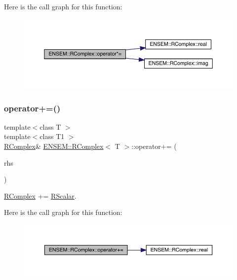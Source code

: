 Here is the call graph for this function\+:
\nopagebreak
\begin{figure}[H]
\begin{center}
\leavevmode
\includegraphics[width=350pt]{d9/d0e/classENSEM_1_1RComplex_a9b5f1c26c1d2cca0a3a0a6d38b5e49bd_cgraph}
\end{center}
\end{figure}
\mbox{\label{classENSEM_1_1RComplex_a0a7beaab81b8f5e2129a4c7b1074f85c}} 
\subsubsection{\texorpdfstring{operator+=()}{operator+=()}\hspace{0.1cm}{\footnotesize\ttfamily [1/6]}}
{\footnotesize\ttfamily template$<$class T $>$ \\
template$<$class T1 $>$ \\
\mbox{\hyperlink{classENSEM_1_1RComplex}{R\+Complex}}\& \mbox{\hyperlink{classENSEM_1_1RComplex}{E\+N\+S\+E\+M\+::\+R\+Complex}}$<$ T $>$\+::operator+= (\begin{DoxyParamCaption}\item[{const \mbox{\hyperlink{classENSEM_1_1RScalar}{R\+Scalar}}$<$ T1 $>$ \&}]{rhs }\end{DoxyParamCaption})\hspace{0.3cm}{\ttfamily [inline]}}



\mbox{\hyperlink{classENSEM_1_1RComplex}{R\+Complex}} += \mbox{\hyperlink{classENSEM_1_1RScalar}{R\+Scalar}}. 

Here is the call graph for this function\+:
\nopagebreak
\begin{figure}[H]
\begin{center}
\leavevmode
\includegraphics[width=350pt]{d9/d0e/classENSEM_1_1RComplex_a0a7beaab81b8f5e2129a4c7b1074f85c_cgraph}
\end{center}
\end{figure}
\mbox{\label{classENSEM_1_1RComplex_a0a7beaab81b8f5e2129a4c7b1074f85c}} 
